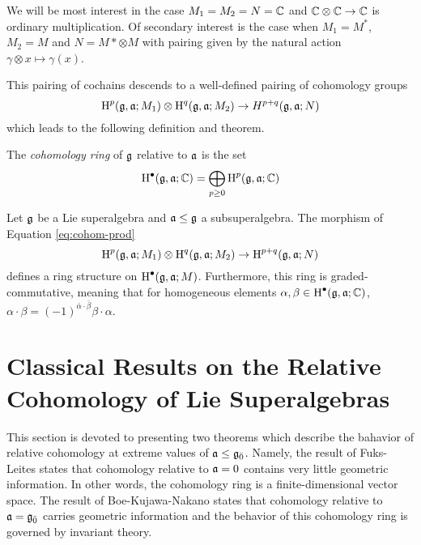 We will be most interest in the case $M_1 = M_2 = N = \mathbb{C}$ and $\mathbb{C} \otimes \mathbb{C} \to \mathbb{C}$ is ordinary multiplication. Of secondary interest is the case when $M_1 = M^*$, $M_2 = M$ and $N = M* \otimes M$ with pairing given by the natural action $\gamma \otimes x \mapsto \gamma(x)$.

This pairing of cochains descends to a well-defined pairing of cohomology groups
\begin{equation}
  \label{eq:cohom-prod}
  \operatorname{H}^p(\mathfrak{g},\mathfrak{a};M_1) \otimes \operatorname{H}^q(\mathfrak{g},\mathfrak{a};M_2) \to H^{p+q}(\mathfrak{g},\mathfrak{a};N)
\end{equation}
which leads to the following definition and theorem.

\begin{definition}
  The \emph{cohomology ring} of $\mathfrak{g}$ relative to $\mathfrak{a}$ is the set
  \[
    \operatorname{H}^\bullet(\mathfrak{g},\mathfrak{a};\mathbb{C}) = \bigoplus_{p \geq 0} \operatorname{H}^p(\mathfrak{g},\mathfrak{a};\mathbb{C})
  \]
  
\end{definition}

\begin{theorem}
  Let $\mathfrak{g}$ be a Lie superalgebra and $\mathfrak{a} \leq \mathfrak{g}$ a subsuperalgebra. The morphism of Equation \ref{eq:cohom-prod}
\[
  \operatorname{H}^p(\mathfrak{g},\mathfrak{a};M_1) \otimes \operatorname{H}^q(\mathfrak{g},\mathfrak{a};M_2) \to \operatorname{H}^{p+q}(\mathfrak{g},\mathfrak{a};N)
\]
defines a ring structure on $\operatorname{H}^\bullet(\mathfrak{g},\mathfrak{a};M)$. Furthermore, this ring is graded-commutative, meaning that for homogeneous elements $\alpha, \beta \in \operatorname{H}^\bullet(\mathfrak{g},\mathfrak{a};\mathbb{C})$, $\alpha \cdot \beta = (-1)^{\bar \alpha \cdot \bar \beta} \beta \cdot \alpha$.
\end{theorem}

\section{Classical Results on the Relative Cohomology of Lie Superalgebras}
\label{sec:bkn-fuks-leites}

This section is devoted to presenting two theorems which describe the bahavior of relative cohomology at extreme values of $\mathfrak{a} \leq {\mathfrak{g}}_{\bar{0}}$. Namely, the result of Fuks-Leites states that cohomology relative to $\mathfrak{a} = 0$ contains very little geometric information. In other words, the cohomology ring is a finite-dimensional vector space. The result of Boe-Kujawa-Nakano states that cohomology relative to $\mathfrak{a} = {\mathfrak{g}}_{\bar{0}}$ carries geometric information and the behavior of this cohomology ring is governed by invariant theory.

